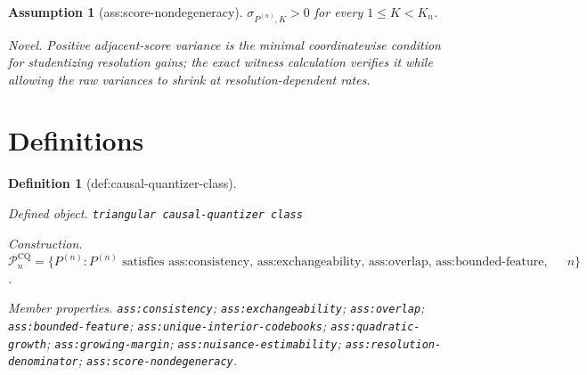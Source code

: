 \documentclass{article}
\newtheorem{assumption}{Assumption}
\newtheorem{definition}{Definition}
\begin{document}
\begin{assumption}[ass:score-nondegeneracy]\label{ass:score-nondegeneracy}
\(\sigma_{P^{(n)},K}>0\) for every \(1\le K<K_n\).
\par\smallskip\noindent\emph{Novel.} Positive adjacent-score variance is the minimal coordinatewise condition for studentizing resolution gains; the exact witness calculation verifies it while allowing the raw variances to shrink at resolution-dependent rates.
\end{assumption}

\section{Definitions}

\begin{definition}[def:causal-quantizer-class]\label{def:causal-quantizer-class}
\par\smallskip\noindent\emph{Defined object.} \texttt{triangular causal-\allowbreak{}quantizer class}
\par\smallskip\noindent\emph{Construction.} \(\mathcal P_n^{\mathrm{CQ}}=\{P^{(n)}:P^{(n)}\text{ satisfies ass:consistency, ass:exchangeability, ass:overlap, ass:bounded-feature, ass:unique-interior-codebooks, ass:quadratic-growth, ass:growing-margin, ass:nuisance-estimability, ass:resolution-denominator, and ass:score-nondegeneracy for row }n\}\).
\par\smallskip\noindent\emph{Member properties.} \texttt{ass:\allowbreak{}consistency}; \texttt{ass:\allowbreak{}exchangeability}; \texttt{ass:\allowbreak{}overlap}; \texttt{ass:\allowbreak{}bounded-\allowbreak{}feature}; \texttt{ass:\allowbreak{}unique-\allowbreak{}interior-\allowbreak{}codebooks}; \texttt{ass:\allowbreak{}quadratic-\allowbreak{}growth}; \texttt{ass:\allowbreak{}growing-\allowbreak{}margin}; \texttt{ass:\allowbreak{}nuisance-\allowbreak{}estimability}; \texttt{ass:\allowbreak{}resolution-\allowbreak{}denominator}; \texttt{ass:\allowbreak{}score-\allowbreak{}nondegeneracy}.
\end{definition}
\end{document}
